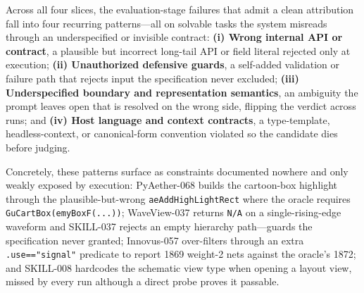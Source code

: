 Across all four slices, the evaluation-stage failures that admit a clean attribution fall into four recurring patterns---all on solvable tasks the system misreads through an underspecified or invisible contract: \textbf{(i) Wrong internal API or contract}, a plausible but incorrect long-tail API or field literal rejected only at execution; \textbf{(ii) Unauthorized defensive guards}, a self-added validation or failure path that rejects input the specification never excluded; \textbf{(iii) Underspecified boundary and representation semantics}, an ambiguity the prompt leaves open that is resolved on the wrong side, flipping the verdict across runs; and \textbf{(iv) Host language and context contracts}, a type-template, headless-context, or canonical-form convention violated so the candidate dies before judging.

Concretely, these patterns surface as constraints documented nowhere and only weakly exposed by execution: PyAether-068 builds the cartoon-box highlight through the plausible-but-wrong \texttt{aeAddHighLightRect} where the oracle requires \texttt{GuCartBox(emyBoxF(...))}; WaveView-037 returns \texttt{N/A} on a single-rising-edge waveform and SKILL-037 rejects an empty hierarchy path---guards the specification never granted; Innovus-057 over-filters through an extra \texttt{.use=="signal"} predicate to report 1869 weight-2 nets against the oracle's 1872; and SKILL-008 hardcodes the schematic view type when opening a layout view, missed by every run although a direct probe proves it passable.
